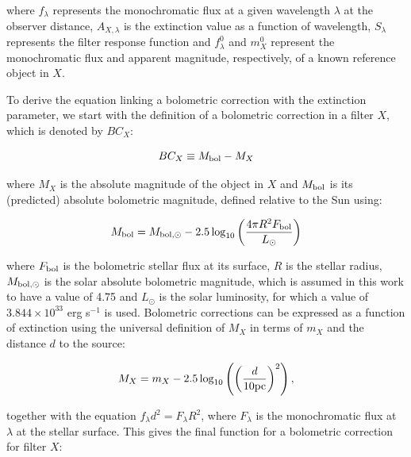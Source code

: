 \documentclass[12pt, a4paper]{report}
\begin{document}
where $f_{\lambda}$ represents the monochromatic flux at a given wavelength $\lambda$ at the observer distance, $A_{X,\lambda}$ is the extinction value as a function of wavelength, $S_{\lambda}$ represents the filter response function and $f_{\lambda}^{0}$ and $m_{X}^{0}$ represent the monochromatic flux and apparent magnitude, respectively, of a known reference object in $X$.


To derive the equation linking a bolometric correction with the extinction parameter, we start with the definition of a bolometric correction in a filter $X$, which is denoted by $BC_{X}$:

\begin{equation}
BC_{X} \equiv M_{\textnormal{bol}} - M_{X}
\label{BC_def}
\end{equation}

where $M_{X}$ is the absolute magnitude of the object in $X$ and $M_{\textnormal{bol}}$ is its (predicted) absolute bolometric magnitude, defined relative to the Sun using:

\begin{equation}
M_{\textnormal{bol}} = M_{\textnormal{bol},\odot} - 2.5 \log_{10} \left( \frac{4\pi R^{2}F_{\textnormal{bol}}}{L_{\odot}} \right)
\label{mbol_sun}
\end{equation}

where  $F_{\textnormal{bol}}$ is the bolometric stellar flux at its surface, $R$ is the stellar radius, $M_{\textnormal{bol},\odot}$ is the solar absolute bolometric magnitude, which is assumed in this work to have a value of 4.75 and $L_{\odot}$ is the solar luminosity, for which a value of $3.844 \times 10^{33}$ erg s$^{-1}$ is used. Bolometric corrections can be expressed as a function of extinction using the universal definition of $M_{X}$ in terms of $m_{X}$ and the distance $d$ to the source:

\begin{equation}
M_{X} = m_{X} - 2.5 \log_{10}\left( \left( \frac{d}{10 \textnormal{pc}} \right)^{2} \right),
\label{abs_mag_def}
\end{equation}

together with the equation $f_{\lambda}d^{2}=F_{\lambda}R^{2}$, where $F_{\lambda}$ is the monochromatic flux at $\lambda$ at the stellar surface. This gives the final function for a bolometric correction for filter $X$:
\end{document}
